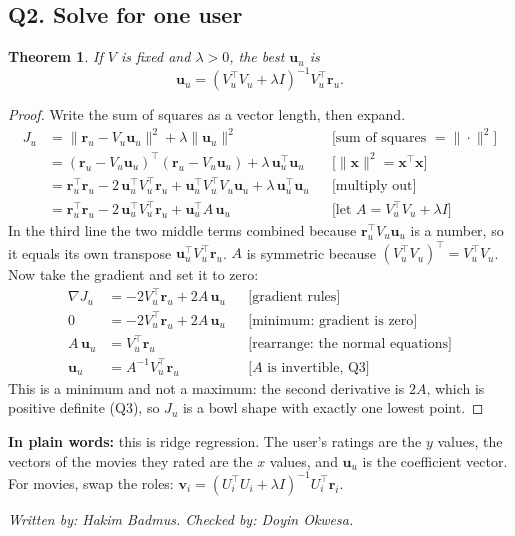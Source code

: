 \documentclass[11pt]{article}
\newtheorem{theorem}{Theorem}
\theoremstyle{definition}
\newcommand{\checked}[2]{\par\smallskip\noindent\textit{Written by: #1. \quad Checked by: #2.}\par}
\begin{document}
\subsection*{Q2. Solve for one user}
\begin{theorem}
If $V$ is fixed and $\lambda>0$, the best $\mathbf u_u$ is
\[
\mathbf u_u=(V_u^\top V_u+\lambda I)^{-1}V_u^\top\mathbf r_u .
\]
\end{theorem}
\begin{proof}
Write the sum of squares as a vector length, then expand.
\begin{align*}
J_u&=\|\mathbf r_u-V_u\mathbf u_u\|^2+\lambda\|\mathbf u_u\|^2 && \text{[sum of squares $=\|\cdot\|^2$]}\\
&=(\mathbf r_u-V_u\mathbf u_u)^\top(\mathbf r_u-V_u\mathbf u_u)+\lambda\,\mathbf u_u^\top\mathbf u_u && \text{[$\|\mathbf x\|^2=\mathbf x^\top\mathbf x$]}\\
&=\mathbf r_u^\top\mathbf r_u-2\,\mathbf u_u^\top V_u^\top\mathbf r_u+\mathbf u_u^\top V_u^\top V_u\mathbf u_u+\lambda\,\mathbf u_u^\top\mathbf u_u && \text{[multiply out]}\\
&=\mathbf r_u^\top\mathbf r_u-2\,\mathbf u_u^\top V_u^\top\mathbf r_u+\mathbf u_u^\top A\,\mathbf u_u && \text{[let $A=V_u^\top V_u+\lambda I$]}
\end{align*}
In the third line the two middle terms combined because $\mathbf r_u^\top V_u\mathbf u_u$ is a number, so it equals its own transpose $\mathbf u_u^\top V_u^\top\mathbf r_u$.
$A$ is symmetric because $(V_u^\top V_u)^\top=V_u^\top V_u$. Now take the gradient and set it to zero:
\begin{align*}
\nabla J_u&=-2V_u^\top\mathbf r_u+2A\,\mathbf u_u && \text{[gradient rules]}\\
0&=-2V_u^\top\mathbf r_u+2A\,\mathbf u_u && \text{[minimum: gradient is zero]}\\
A\,\mathbf u_u&=V_u^\top\mathbf r_u && \text{[rearrange: the normal equations]}\\
\mathbf u_u&=A^{-1}V_u^\top\mathbf r_u && \text{[$A$ is invertible, Q3]}
\end{align*}
This is a minimum and not a maximum: the second derivative is $2A$, which is positive definite (Q3), so $J_u$ is a bowl shape with exactly one lowest point.
\end{proof}
\noindent\textbf{In plain words:} this is ridge regression. The user's ratings are the $y$ values, the vectors of the movies they rated are the $x$ values, and $\mathbf u_u$ is the coefficient vector. For movies, swap the roles: $\mathbf v_i=(U_i^\top U_i+\lambda I)^{-1}U_i^\top\mathbf r_i$.
\checked{Hakim Badmus}{Doyin Okwesa}
\end{document}
